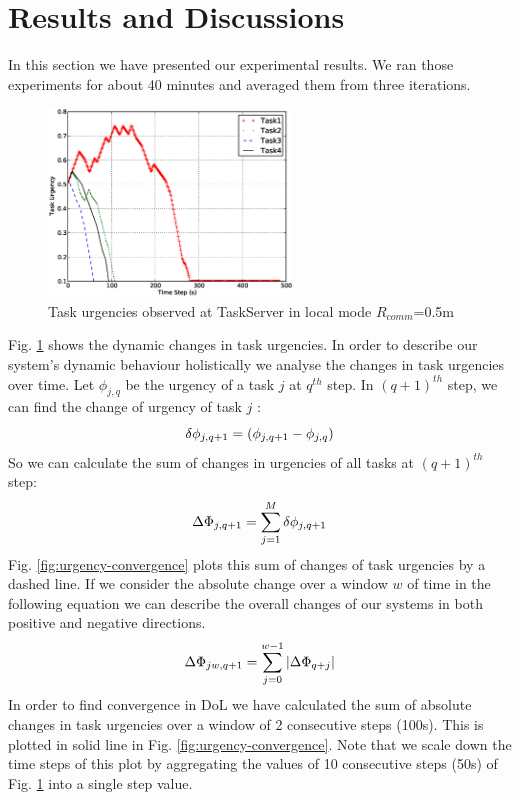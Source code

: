 \documentclass[letterpaper, 10 pt, conference]{ieeeconf}  %
\begin{document}
\section{Results and Discussions}
\label{sec:results}
In this section we have presented our experimental results. We ran those experiments for about 40 minutes and averaged them from three iterations.
\begin{figure}
\centering
\includegraphics[height=5cm, angle=0]
{images/local-500cm/PlotUrgencyLog-2010Feb15-171017.eps}
\caption{\small Task urgencies observed at TaskServer in local mode $R_{comm}$=0.5m}
\label{fig:raw-urgencies} %
\end{figure}
Fig. \ref{fig:raw-urgencies} shows the dynamic changes in task urgencies.
In order to describe our system's dynamic behaviour holistically we analyse the changes in task urgencies over time. Let $ \phi_{j, q}$ be the urgency of a task $j$ at $q^{th}$ step. In $(q+1)^{th}$ step, we can find the change of urgency of task $j$ :\\
\begin{equation} 
\small
\delta \phi_{j, q+1} = ( \phi_{j, q+1} - \phi_{j, q}) 
\end{equation}
So we can calculate the sum of changes in urgencies of all tasks at $(q+1)^{th}$ step:
\begin{equation} 
\small
\Delta \Phi_{j, q+1} = \sum_{j=1}^{M} \delta \phi_{j, q+1} 
\label{eqn:Delta-Phi}
\end{equation}
Fig. \ref{fig:urgency-convergence} plots this sum of changes of task urgencies by a dashed line. If we consider the absolute change over a window $w$ of time in the following equation we can describe the overall changes of our systems in both positive and negative directions.
%
\begin{equation}
\small
\Delta \Phi_{jw, q+1} = \sum_{j=0}^{w-1} \left | \Delta \Phi_{q+j} \right |
\end{equation}
%
In order to find convergence in DoL we have calculated the sum of absolute changes in task urgencies over a window of 2 consecutive steps (100s). This is plotted in solid line in Fig. \ref{fig:urgency-convergence}. Note that we scale down the time steps of this plot by aggregating the values of 10 consecutive steps (50s) of Fig. \ref{fig:raw-urgencies} into a single step value.
\end{document}

